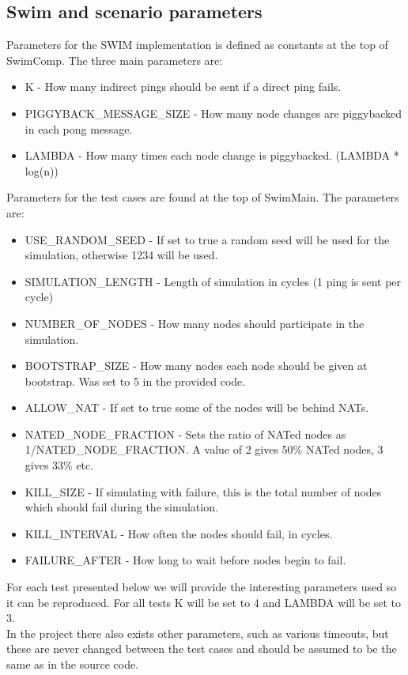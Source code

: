 \documentclass[10pt]{proc}
\begin{document}
\subsection{Swim and scenario parameters}
Parameters for the SWIM implementation is defined as constants at the top of SwimComp. The three main parameters are:
\begin{itemize}
\item K - How many indirect pings should be sent if a direct ping fails.
\item PIGGYBACK\_MESSAGE\_SIZE - How many node changes are piggybacked in each pong message.
\item LAMBDA - How many times each node change is piggybacked. (LAMBDA * log(n))
\end{itemize}
Parameters for the test cases are found at the top of SwimMain. The parameters are:
\begin{itemize}
\item USE\_RANDOM\_SEED - If set to true a random seed will be used for the simulation, otherwise 1234 will be used.
\item SIMULATION\_LENGTH - Length of simulation in cycles (1 ping is sent per cycle)
\item NUMBER\_OF\_NODES - How many nodes should participate in the simulation.
\item BOOTSTRAP\_SIZE - How many nodes each node should be given at bootstrap. Was set to 5 in the provided code.
\item ALLOW\_NAT - If set to true some of the nodes will be behind NATs.
\item NATED\_NODE\_FRACTION - Sets the ratio of NATed nodes as 1/NATED\_NODE\_FRACTION. A value of 2 gives 50\% NATed nodes, 3 gives 33\% etc.
\item KILL\_SIZE - If simulating with failure, this is the total number of nodes which should fail during the simulation.
\item KILL\_INTERVAL - How often the nodes should fail, in cycles.
\item FAILURE\_AFTER - How long to wait before nodes begin to fail.
\end{itemize}
For each test presented below we will provide the interesting parameters used so it can be reproduced. For all tests K will be set to 4 and LAMBDA will be set to 3.
\\[10pt]
In the project there also exists other parameters, such as various timeouts, but these are never changed between the test cases and should be assumed to be the same as in the source code.
\end{document}
